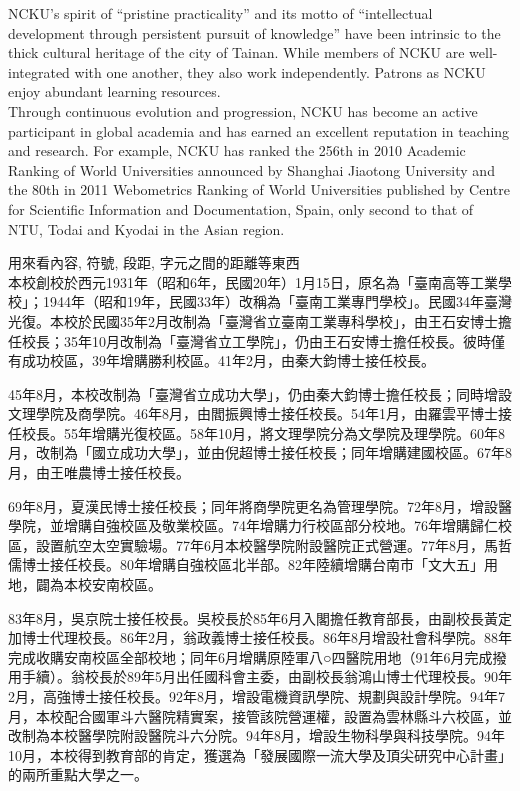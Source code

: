 NCKU's spirit of ``pristine practicality'' and its motto of ``intellectual development through persistent pursuit of knowledge'' have been intrinsic to the thick cultural heritage of the city of Tainan. While members of NCKU are well-integrated with one another, they also work independently. Patrons as NCKU enjoy abundant learning resources.\\

Through continuous evolution and progression, NCKU has become an active participant in global academia and has earned an excellent reputation in teaching and research. For example, NCKU has ranked the 256th in 2010 Academic Ranking of World Universities announced by Shanghai Jiaotong University and the 80th in 2011 Webometrics Ranking of World Universities published by Centre for Scientific Information and Documentation, Spain, only second to that of NTU, Todai and Kyodai in the Asian region.


\UseChiLinesSpacing

\newpage
{}
用來看內容, 符號, 段距, 字元之間的距離等東西\\

本校創校於西元1931年（昭和6年，民國20年）1月15日，原名為「臺南高等工業學校」；1944年（昭和19年，民國33年）改稱為「臺南工業專門學校」。民國34年臺灣光復。本校於民國35年2月改制為「臺灣省立臺南工業專科學校」，由王石安博士擔任校長；35年10月改制為「臺灣省立工學院」，仍由王石安博士擔任校長。彼時僅有成功校區，39年增購勝利校區。41年2月，由秦大鈞博士接任校長。

45年8月，本校改制為「臺灣省立成功大學」，仍由秦大鈞博士擔任校長；同時增設文理學院及商學院。46年8月，由閻振興博士接任校長。54年1月，由羅雲平博士接任校長。55年增購光復校區。58年10月，將文理學院分為文學院及理學院。60年8月，改制為「國立成功大學」，並由倪超博士接任校長；同年增購建國校區。67年8月，由王唯農博士接任校長。

69年8月，夏漢民博士接任校長；同年將商學院更名為管理學院。72年8月，增設醫學院，並增購自強校區及敬業校區。74年增購力行校區部分校地。76年增購歸仁校區，設置航空太空實驗場。77年6月本校醫學院附設醫院正式營運。77年8月，馬哲儒博士接任校長。80年增購自強校區北半部。82年陸續增購台南市「文大五」用地，闢為本校安南校區。

83年8月，吳京院士接任校長。吳校長於85年6月入閣擔任教育部長，由副校長黃定加博士代理校長。86年2月，翁政義博士接任校長。86年8月增設社會科學院。88年完成收購安南校區全部校地；同年6月增購原陸軍八○四醫院用地（91年6月完成撥用手續）。翁校長於89年5月出任國科會主委，由副校長翁鴻山博士代理校長。90年2月，高強博士接任校長。92年8月，增設電機資訊學院、規劃與設計學院。94年7月，本校配合國軍斗六醫院精實案，接管該院營運權，設置為雲林縣斗六校區，並改制為本校醫學院附設醫院斗六分院。94年8月，增設生物科學與科技學院。94年10月，本校得到教育部的肯定，獲選為「發展國際一流大學及頂尖研究中心計畫」的兩所重點大學之一。

